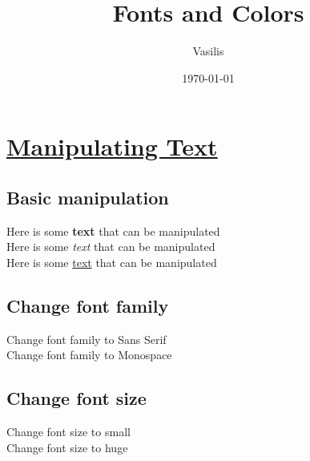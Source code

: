 \documentclass{article}
\title{Fonts and Colors}
\author{Vasilis}
\date{\today}
\begin{document}
\maketitle

\section{\underline{Manipulating Text}}

\subsection{Basic manipulation}
Here is some \textbf{text} that can be manipulated \\
Here is some \textit{text} that can be manipulated \\
Here is some \underline{text} that can be manipulated

\subsection{Change font family}

Change font family to {\sffamily Sans Serif} \\
Change font family to {\ttfamily Monospace}

\subsection{Change font size}

Change font size to {\small small} \\
Change font size to {\huge huge}
\end{document}
